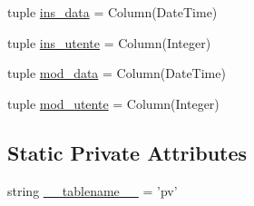 \begin{DoxyCompactItemize}
\item 
tuple \hyperlink{classmmasgis_1_1mysql__sqlalchemy__class_1_1Pv_a40d1b26ee7357a0654dcd007b4a86ea2}{ins\_\-data} = Column(DateTime)
\item 
tuple \hyperlink{classmmasgis_1_1mysql__sqlalchemy__class_1_1Pv_a271db5bef67ae1ce813f5a288f04009d}{ins\_\-utente} = Column(Integer)
\item 
tuple \hyperlink{classmmasgis_1_1mysql__sqlalchemy__class_1_1Pv_a652936ccc1e8a83d0d7ff94c78377a23}{mod\_\-data} = Column(DateTime)
\item 
tuple \hyperlink{classmmasgis_1_1mysql__sqlalchemy__class_1_1Pv_a03552c6c674c9a27b16c78e8b8710598}{mod\_\-utente} = Column(Integer)
\end{DoxyCompactItemize}
\subsection*{Static Private Attributes}
\begin{DoxyCompactItemize}
\item 
string \hyperlink{classmmasgis_1_1mysql__sqlalchemy__class_1_1Pv_a3e73f4528c047e1d1ea1e394f64d281c}{\_\-\_\-tablename\_\-\_\-} = 'pv'
\end{DoxyCompactItemize}


